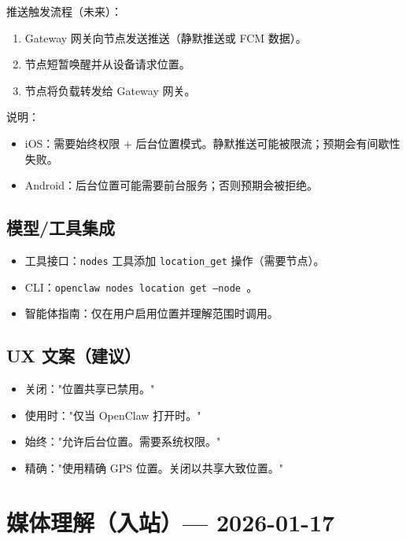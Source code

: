推送触发流程（未来）：

\begin{enumerate}
  \item Gateway 网关向节点发送推送（静默推送或 FCM 数据）。
  \item 节点短暂唤醒并从设备请求位置。
  \item 节点将负载转发给 Gateway 网关。
\end{enumerate}


说明：

\begin{itemize}
  \item iOS：需要始终权限 + 后台位置模式。静默推送可能被限流；预期会有间歇性失败。
  \item Android：后台位置可能需要前台服务；否则预期会被拒绝。
\end{itemize}


\subsection{模型/工具集成}


\begin{itemize}
  \item 工具接口：\texttt{nodes} 工具添加 \texttt{location\_get} 操作（需要节点）。
  \item CLI：\texttt{openclaw nodes location get --node }。
  \item 智能体指南：仅在用户启用位置并理解范围时调用。
\end{itemize}


\subsection{UX 文案（建议）}


\begin{itemize}
  \item 关闭："位置共享已禁用。"
  \item 使用时："仅当 OpenClaw 打开时。"
  \item 始终："允许后台位置。需要系统权限。"
  \item 精确："使用精确 GPS 位置。关闭以共享大致位置。"
\end{itemize}



\clearpage

\section{媒体理解（入站）— 2026-01-17}


